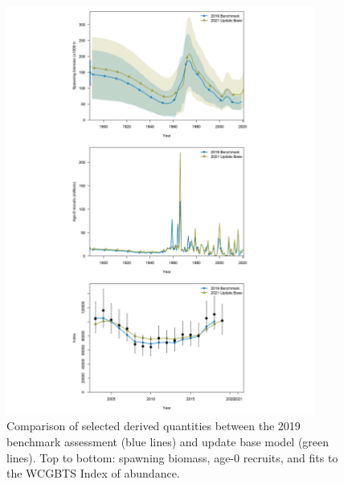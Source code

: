 \documentclass[11pt,
  english,
  a4paper,
]{article}
\begin{document}
\begin{figure}
\centering
\includegraphics[width=0.9\textwidth,height=0.9\textheight]{figs/base_panel.png}
\caption{Comparison of selected derived quantities between the 2019 benchmark assessment (blue lines) and update base model (green lines). Top to bottom: spawning biomass, age-0 recruits, and fits to the WCGBTS Index of abundance. \label{fig:basepanel}}
\end{figure}

\tagmcend\tagstructend

\end{document}
